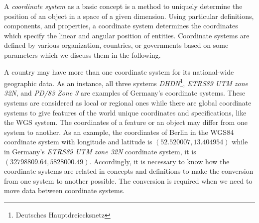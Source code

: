 \documentclass[a4paper,12pt]{article}
\begin{document}
A \emph{coordinate system} as a basic concept is a method to uniquely determine the position of an object in a space of a given dimension. Using particular definitions, components, and properties, a coordinate system determines the coordinates which specify the linear and angular position of entities. Coordinate systems are defined by various organization, countries, or governments based on some parameters which we discuss them in the following.

A country may have more than one coordinate system for its national-wide geographic data. As an instance, all three systems \textit{DHDN}\footnote{Deutsches Hauptdreiecksnetz}, \textit{ETRS89 UTM zone 32N}, and \textit{PD/83 Zone 3} are examples of Germany's coordinate systems. These systems are considered as local or regional ones while there are global coordinate systems to give features of the world unique coordinates and specifications, like the WGS system. The coordinates of a feature or an object may differ from one system to another. As an example, the coordinates of Berlin in the WGS84 coordinate system with longitude and latitude is $(52.520007, 13.404954)$ while in Germany's \textit{ETRS89 UTM zone 32N} coordinate system, it is $(32798809.64, 5828000.49)$. Accordingly, it is necessary to know how the coordinate systems are related in concepts and definitions to make the conversion from one system to another possible. The conversion is required when we need to move data between coordinate systems.
\end{document}
